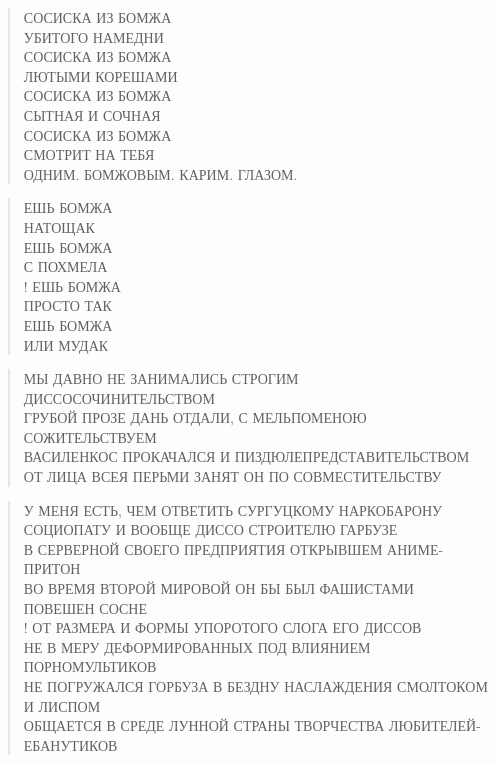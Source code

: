 \poemtitle{***}
\begin{verse}
СОСИСКА ИЗ БОМЖА\\
УБИТОГО НАМЕДНИ\\
СОСИСКА ИЗ БОМЖА\\
ЛЮТЫМИ КОРЕШАМИ\\
СОСИСКА ИЗ БОМЖА\\
СЫТНАЯ И СОЧНАЯ\\
СОСИСКА ИЗ БОМЖА\\
СМОТРИТ НА ТЕБЯ\\
ОДНИМ. БОМЖОВЫМ. КАРИМ. ГЛАЗОМ.
\end{verse}

\poemtitle{***}
\begin{verse}
ЕШЬ БОМЖА\\
НАТОЩАК\\
ЕШЬ БОМЖА\\
С ПОХМЕЛА\\!
ЕШЬ БОМЖА\\
ПРОСТО ТАК\\
ЕШЬ БОМЖА\\
ИЛИ МУДАК
\end{verse}

\poemtitle{***}
\begin{verse}
МЫ ДАВНО НЕ ЗАНИМАЛИСЬ СТРОГИМ ДИССОСОЧИНИТЕЛЬСТВОМ\\
ГРУБОЙ ПРОЗЕ ДАНЬ ОТДАЛИ, С МЕЛЬПОМЕНОЮ СОЖИТЕЛЬСТВУЕМ\\
ВАСИЛЕНКОС ПРОКАЧАЛСЯ И ПИЗДЮЛЕПРЕДСТАВИТЕЛЬСТВОМ\\
ОТ ЛИЦА ВСЕЯ ПЕРЬМИ ЗАНЯТ ОН ПО СОВМЕСТИТЕЛЬСТВУ
\end{verse}

\poemtitle{***}
\begin{verse}
У МЕНЯ ЕСТЬ, ЧЕМ ОТВЕТИТЬ СУРГУЦКОМУ НАРКОБАРОНУ\\
СОЦИОПАТУ И ВООБЩЕ ДИССО СТРОИТЕЛЮ ГАРБУЗЕ\\
В СЕРВЕРНОЙ СВОЕГО ПРЕДПРИЯТИЯ ОТКРЫВШЕМ АНИМЕ-ПРИТОН\\
ВО ВРЕМЯ ВТОРОЙ МИРОВОЙ ОН БЫ БЫЛ ФАШИСТАМИ ПОВЕШЕН СОСНЕ\\!
ОТ РАЗМЕРА И ФОРМЫ УПОРОТОГО СЛОГА ЕГО ДИССОВ\\
НЕ В МЕРУ ДЕФОРМИРОВАННЫХ ПОД ВЛИЯНИЕМ ПОРНОМУЛЬТИКОВ\\
НЕ ПОГРУЖАЛСЯ ГОРБУЗА В БЕЗДНУ НАСЛАЖДЕНИЯ СМОЛТОКОМ И ЛИСПОМ\\
ОБЩАЕТСЯ В СРЕДЕ ЛУННОЙ СТРАНЫ ТВОРЧЕСТВА ЛЮБИТЕЛЕЙ-ЕБАНУТИКОВ
\end{verse}

